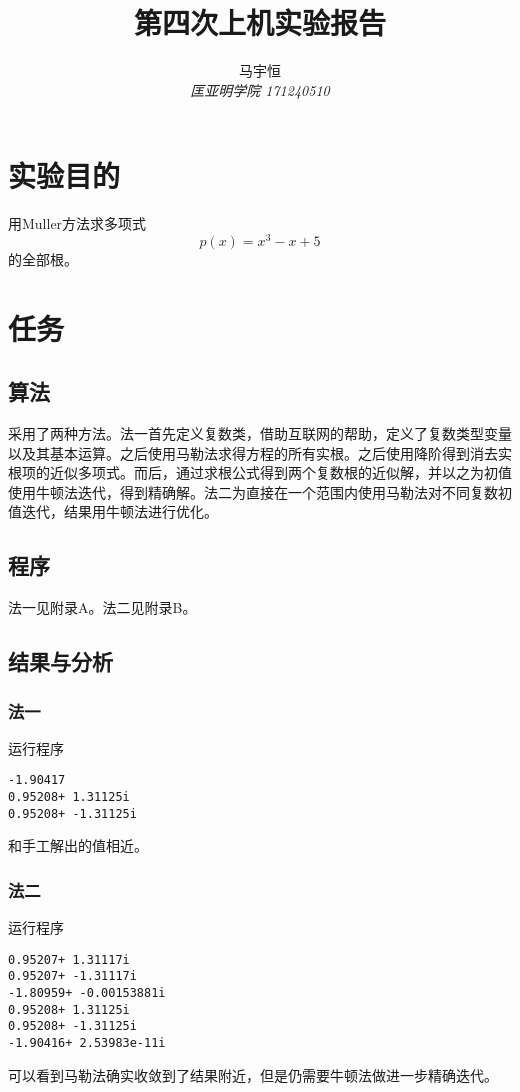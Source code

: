 \documentclass[a4paper,11pt,onecolumn,twoside]{article}
\title{\textbf{第四次上机实验报告}}
\author{
马宇恒
\\[2pt]
{\small \textit{匡亚明学院 171240510}}}
\date{}
\begin{document}
\maketitle
\thispagestyle{firststyle}
\setlength{\oddsidemargin}{ 1cm}
\setlength{\evensidemargin}{\oddsidemargin}
\setlength{\textwidth}{15.50cm}
\vspace{-.8cm}


\setcounter{page}{1}

\setlength{\oddsidemargin}{-.5cm}  %
\setlength{\evensidemargin}{\oddsidemargin}
\setlength{\textwidth}{17.00cm}

\section{实验目的}
用Muller方法求多项式$$p(x)=x^{3}-x+5$$的全部根。

\section{任务}
\subsection{算法}
采用了两种方法。法一首先定义复数类，借助互联网的帮助，定义了复数类型变量以及其基本运算。之后使用马勒法求得方程的所有实根。之后使用降阶得到消去实根项的近似多项式。而后，通过求根公式得到两个复数根的近似解，并以之为初值使用牛顿法迭代，得到精确解。法二为直接在一个范围内使用马勒法对不同复数初值迭代，结果用牛顿法进行优化。
\subsection{程序}
法一见附录A。法二见附录B。
\subsection{结果与分析}
\subsubsection{法一}
运行程序
\begin{lstlisting}
-1.90417
0.95208+ 1.31125i
0.95208+ -1.31125i
\end{lstlisting}
和手工解出的值相近。
\subsubsection{法二}
运行程序
\begin{lstlisting}
0.95207+ 1.31117i
0.95207+ -1.31117i
-1.80959+ -0.00153881i
0.95208+ 1.31125i
0.95208+ -1.31125i
-1.90416+ 2.53983e-11i
\end{lstlisting}
可以看到马勒法确实收敛到了结果附近，但是仍需要牛顿法做进一步精确迭代。
\end{document}

